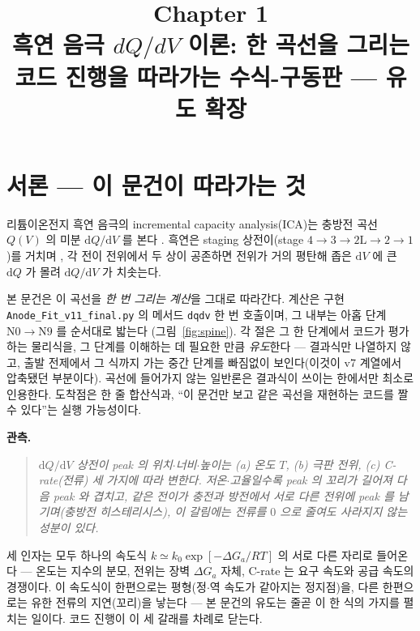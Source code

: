 \documentclass[11pt,a4paper]{article}
\title{\textbf{\LARGE Chapter 1}\\[0.35em]\Large 흑연 음극 $dQ/dV$ 이론: 한 곡선을 그리는 코드 진행을 따라가는 수식-구동판 — 유도 확장}
\author{}
\date{}
\newcommand{\dd}{\mathrm{d}}
\newcommand{\code}[1]{\texttt{#1}}
\begin{document}
\maketitle

\section*{서론 — 이 문건이 따라가는 것}
리튬이온전지 흑연 음극의 incremental capacity analysis(ICA)는 충방전 곡선 $Q(V)$ 의 미분
$\dd Q/\dd V$ 를 본다 \cite{bloom2005,dubarry2012}. 흑연은 staging 상전이(stage
$4\!\to\!3\!\to\!2\mathrm L\!\to\!2\!\to\!1$)를 거치며 \cite{dahn1991,ohzuku1993}, 각 전이 전위에서
두 상이 공존하면 전위가 거의 평탄해 좁은 $\dd V$ 에 큰 $\dd Q$ 가 몰려 $\dd Q/\dd V$ 가 치솟는다.

본 문건은 이 곡선을 \emph{한 번 그리는 계산}을 그대로 따라간다. 계산은 구현 \code{Anode\_Fit\_v11\_final.py}
의 메서드 \code{dqdv} 한 번 호출이며, 그 내부는 아홉 단계 $\mathrm N0\!\to\!\mathrm N9$ 를 순서대로 밟는다
(그림~\ref{fig:spine}). 각 절은 그 한 단계에서 코드가 평가하는 물리식을, 그 단계를 이해하는 데 필요한 만큼
\emph{유도}한다 — 결과식만 나열하지 않고, 출발 전제에서 그 식까지 가는 중간 단계를 빠짐없이 보인다(이것이 v7
계열에서 압축됐던 부분이다). 곡선에 들어가지 않는 일반론은 결과식이 쓰이는 한에서만 최소로 인용한다. 도착점은 한 줄
합산식과, ``이 문건만 보고 같은 곡선을 재현하는 코드를 짤 수 있다''는 실행 가능성이다.

\textbf{관측.}
\begin{quote}\itshape
$\dd Q/\dd V$ 상전이 peak 의 위치$\cdot$너비$\cdot$높이는 (a) 온도 $T$, (b) 극판 전위, (c) C-rate(전류)
세 가지에 따라 변한다. 저온$\cdot$고율일수록 peak 의 꼬리가 길어져 다음 peak 와 겹치고, 같은 전이가 충전과 방전에서
서로 다른 전위에 peak 를 남기며(충방전 히스테리시스), 이 갈림에는 전류를 $0$ 으로 줄여도 사라지지 않는 성분이 있다.
\end{quote}

세 인자는 모두 하나의 속도식 $k\simeq k_0\exp[-\Delta G_a/RT]$ 의 서로 다른 자리로 들어온다 — 온도는 지수의 분모,
전위는 장벽 $\Delta G_a$ 자체, C-rate 는 요구 속도와 공급 속도의 경쟁이다. 이 속도식이 한편으로는 평형(정$\cdot$역
속도가 같아지는 정지점)을, 다른 한편으로는 유한 전류의 지연(꼬리)을 낳는다 — 본 문건의 유도는 줄곧 이 한 식의 가지를
펼치는 일이다. 코드 진행이 이 세 갈래를 차례로 닫는다.
\end{document}
